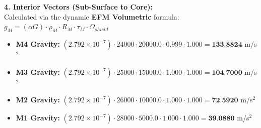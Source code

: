\documentclass[11pt, a4paper]{article}
\begin{document}
  \vspace{0.5em}
  \noindent \textbf{4. Interior Vectors (Sub-Surface to Core):} \\[0.5em]
  \hspace*{1em} Calculated via the dynamic \textbf{EFM Volumetric} formula: $g_M = (\alpha G) \cdot \rho_{M} \cdot R_M \cdot \tau_M \cdot \Omega_{shield}$
  \begin{itemize}
    \item \textbf{M4 Gravity:} $(2.792 \times 10^{-7}) \cdot 24000 \cdot 20000.0 \cdot 0.999 \cdot 1.000 = \textbf{133.8824}$ m/s$^2$
    \item \textbf{M3 Gravity:} $(2.792 \times 10^{-7}) \cdot 25000 \cdot 15000.0 \cdot 1.000 \cdot 1.000 = \textbf{104.7000}$ m/s$^2$
    \item \textbf{M2 Gravity:} $(2.792 \times 10^{-7}) \cdot 26000 \cdot 10000.0 \cdot 1.000 \cdot 1.000 = \textbf{72.5920}$ m/s$^2$
    \item \textbf{M1 Gravity:} $(2.792 \times 10^{-7}) \cdot 28000 \cdot 5000.0 \cdot 1.000 \cdot 1.000 = \textbf{39.0880}$ m/s$^2$
  \end{itemize}
\end{document}
